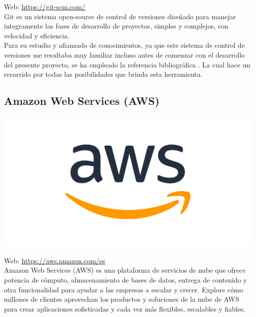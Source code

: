 Web: \url{https://git-scm.com/}\\

Git es un sistema open-source de control de versiones diseñado para manejar íntegramente las fases de desarrollo de proyectos, simples y complejos, con velocidad y eficiencia.\\

Para su estudio y afianzado de conocimientos, ya que este sistema de control de versiones me resultaba muy familiar incluso antes de comenzar con el desarrollo del presente proyecto, se ha empleado 
la referencia bibliográfica \cite{book:git}. La cual hace un recorrido por todas las posibilidades que brinda esta herramienta.\\


\subsection{Amazon Web Services (AWS) }

\begin{center}\includegraphics[scale=0.25]{imagenes/aws_logo.png}\end{center}

Web: \url{https://aws.amazon.com/es}\\

Amazon Web Services (AWS) es una plataforma de servicios de nube que ofrece potencia de cómputo, almacenamiento de bases de datos, entrega de contenido y otra funcionalidad para ayudar a las empresas a escalar y crecer. Explore cómo millones de clientes aprovechan los productos y soluciones de la nube de AWS para crear aplicaciones sofisticadas y cada vez más flexibles, escalables y fiables.\\

